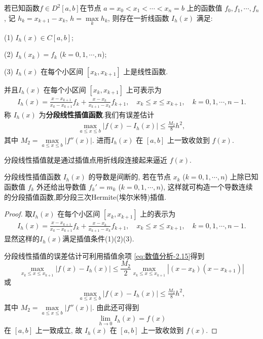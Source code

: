 \documentclass[../../main.tex]{subfiles}
\begin{document}
\begin{theorem}[分段线性插值]
若已知函数$f\in D^2[a,b]$在节点 $a = x_0 < x_1 < \cdots < x_n = b$ 上的函数值 $f_0, f_1, \cdots, f_n$, 记 $h_k = x_{k + 1} - x_k$, $h = \max\limits_k h_k$, 则存在一折线函数 $I_h(x)$ 满足:

(1) $I_h(x) \in C[a, b]$;

(2) $I_h(x_k) = f_k$ ($k = 0, 1, \cdots, n$);

(3) $I_h(x)$ 在每个小区间 $[x_k, x_{k + 1}]$ 上是线性函数.

并且$I_h(x)$ 在每个小区间 $[x_k, x_{k + 1}]$ 上可表示为
\begin{align}
I_h(x) = \frac{x - x_{k + 1}}{x_k - x_{k + 1}} f_k + \frac{x - x_k}{x_{k + 1} - x_k} f_{k + 1}, \quad x_k \leqslant x \leqslant x_{k + 1}, \quad k = 0, 1, \cdots, n - 1. \label{5.1}
\end{align}
称 $I_h(x)$ 为\textbf{分段线性插值函数}.我们有误差估计
\begin{align}
\max_{a \leqslant x \leqslant b} | f(x) - I_h(x) | \leqslant \frac{M_2}{8} h^2, \label{5.2}
\end{align}
其中 $M_2 = \max\limits_{a \leqslant x \leqslant b} | f''(x) |$. 
进而$I_h(x)$ 在 $[a, b]$ 上一致收敛到 $f(x)$.
\end{theorem}
\begin{note}
分段线性插值就是通过插值点用折线段连接起来逼近 $f(x)$. 
\end{note}
\begin{note}
分段线性插值函数 $I_h(x)$ 的导数是间断的, 若在节点 $x_k$ ($k = 0, 1, \cdots, n$) 上除已知函数值 $f_k$ 外还给出导数值 $f_k' = m_k$ ($k = 0, 1, \cdots, n$), 这样就可构造一个导数连续的分段插值函数,即分段三次Hermite(埃尔米特)插值.
\end{note}
\begin{proof}
取$I_h(x)$ 在每个小区间 $[x_k, x_{k + 1}]$ 上的表示为
\begin{align*}
I_h(x) = \frac{x - x_{k + 1}}{x_k - x_{k + 1}} f_k + \frac{x - x_k}{x_{k + 1} - x_k} f_{k + 1}, \quad x_k \leqslant x \leqslant x_{k + 1}, \quad k = 0, 1, \cdots, n - 1.
\end{align*}
显然这样的$I_h(x)$满足插值条件(1)(2)(3).

分段线性插值的误差估计可利用插值余项 \eqref{eq:数值分析-2.15}得到
\[
\max_{x_k \leqslant x \leqslant x_{k + 1}} | f(x) - I_h(x) | \leqslant \frac{M_2}{2} \max_{x_k \leqslant x \leqslant x_{k + 1}} | (x - x_k)(x - x_{k + 1}) |
\]
或
\begin{align*}
\max_{a \leqslant x \leqslant b} | f(x) - I_h(x) | \leqslant \frac{M_2}{8} h^2,
\end{align*}
其中 $M_2 = \max\limits_{a \leqslant x \leqslant b} | f''(x) |$. 由此还可得到
\[
\lim_{h \to 0} I_h(x) = f(x)
\]
在 $[a, b]$ 上一致成立, 故 $I_h(x)$ 在 $[a, b]$ 上一致收敛到 $f(x)$.
\end{proof}
\end{document}
